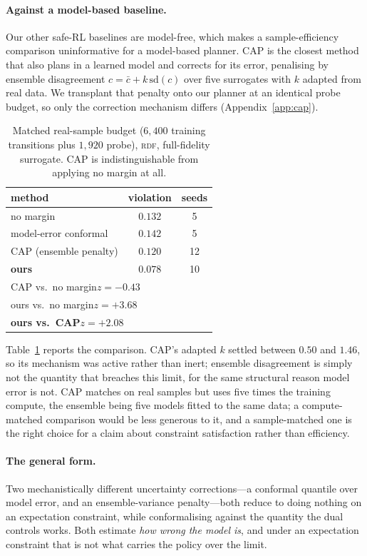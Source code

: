 \paragraph{Against a model-based baseline.}
Our other safe-RL baselines are model-free, which makes a sample-efficiency
comparison uninformative for a model-based planner. CAP \citep{ma2022cap} is
the closest method that also plans in a learned model and corrects for its
error, penalising by ensemble disagreement $c = \bar{c} + k\,\mathrm{sd}(c)$
over five surrogates with $k$ adapted from real data. We transplant that
penalty onto our planner at an identical probe budget, so only the correction
mechanism differs (Appendix~\ref{app:cap}).

\begin{table}[t]
\caption{Matched real-sample budget ($6{,}400$ training transitions plus
$1{,}920$ probe), \textsc{rdf}, full-fidelity surrogate. CAP is
indistinguishable from applying no margin at all.}
\label{tab:cap}
\centering\small
\begin{tabular}{lcc}
\toprule
method & violation & seeds \\
\midrule
no margin & $0.132$ & 5 \\
model-error conformal & $0.142$ & 5 \\
CAP (ensemble penalty) & $0.120$ & 12 \\
\textbf{ours} & $\mathbf{0.078}$ & 10 \\
\midrule
\multicolumn{3}{l}{\small CAP vs.\ no margin\quad $z=-0.43$} \\
\multicolumn{3}{l}{\small ours vs.\ no margin\quad $z=+3.68$} \\
\multicolumn{3}{l}{\small \textbf{ours vs.\ CAP\quad $z=+2.08$}} \\
\bottomrule
\end{tabular}
\end{table}

Table~\ref{tab:cap} reports the comparison. CAP's adapted $k$ settled between
$0.50$ and $1.46$, so its mechanism was active rather than inert; ensemble
disagreement is simply not the quantity that breaches this limit, for the same
structural reason model error is not. CAP matches on real samples but uses five
times the training compute, the ensemble being five models fitted to the same
data; a compute-matched comparison would be less generous to it, and a
sample-matched one is the right choice for a claim about constraint
satisfaction rather than efficiency.

\paragraph{The general form.}
Two mechanistically different uncertainty corrections---a conformal quantile
over model error, and an ensemble-variance penalty---both reduce to doing
nothing on an expectation constraint, while conformalising against the quantity
the dual controls works. Both estimate \emph{how wrong the model is}, and under
an expectation constraint that is not what carries the policy over the limit.

